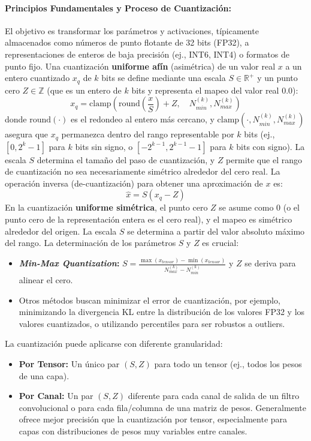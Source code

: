 \documentclass[12pt]{article}
\begin{document}
\paragraph{Principios Fundamentales y Proceso de Cuantización:}
El objetivo es transformar los parámetros y activaciones, típicamente almacenados como números de punto flotante de 32 bits (FP32), a representaciones de enteros de baja precisión (ej., INT6, INT4) o formatos de punto fijo.
Una cuantización \textbf{uniforme afín} (asimétrica) de un valor real $x$ a un entero cuantizado $x_q$ de $k$ bits se define mediante una escala $S \in \mathbb{R}^+$ y un punto cero $Z \in \mathbb{Z}$ (que es un entero de $k$ bits y representa el mapeo del valor real $0.0$):
\begin{equation}
x_q = \text{clamp} \left( \text{round}\left(\frac{x}{S}\right) + Z, \quad N_{min}^{(k)}, N_{max}^{(k)} \right)
\label{eq:quantization_affine}
\end{equation}
donde $\text{round}(\cdot)$ es el redondeo al entero más cercano, y $\text{clamp}(\cdot, N_{min}^{(k)}, N_{max}^{(k)})$ asegura que $x_q$ permanezca dentro del rango representable por $k$ bits (ej., $[0, 2^k-1]$ para $k$ bits sin signo, o $[-2^{k-1}, 2^{k-1}-1]$ para $k$ bits con signo). La escala $S$ determina el tamaño del paso de cuantización, y $Z$ permite que el rango de cuantización no sea necesariamente simétrico alrededor del cero real. La operación inversa (de-cuantización) para obtener una aproximación de $x$ es:
\begin{equation}
\hat{x} = S (x_q - Z)
\label{eq:dequantization_affine}
\end{equation}
En la cuantización \textbf{uniforme simétrica}, el punto cero $Z$ se asume como $0$ (o el punto cero de la representación entera es el cero real), y el mapeo es simétrico alrededor del origen. La escala $S$ se determina a partir del valor absoluto máximo del rango.
La determinación de los parámetros $S$ y $Z$ es crucial:
\begin{itemize}
    \item \textbf{\textit{Min-Max Quantization}:} $S = \frac{\max(x_{tensor}) - \min(x_{tensor})}{N_{max}^{(k)} - N_{min}^{(k)}}$ y $Z$ se deriva para alinear el cero.
    \item Otros métodos buscan minimizar el error de cuantización, por ejemplo, minimizando la divergencia KL entre la distribución de los valores FP32 y los valores cuantizados, o utilizando percentiles para ser robustos a outliers.
\end{itemize}
La cuantización puede aplicarse con diferente granularidad:
\begin{itemize}
    \item \textbf{Por Tensor:} Un único par $(S, Z)$ para todo un tensor (ej., todos los pesos de una capa).
    \item \textbf{Por Canal:} Un par $(S, Z)$ diferente para cada canal de salida de un filtro convolucional o para cada fila/columna de una matriz de pesos. Generalmente ofrece mejor precisión que la cuantización por tensor, especialmente para capas con distribuciones de pesos muy variables entre canales.
\end{itemize}
\end{document}
